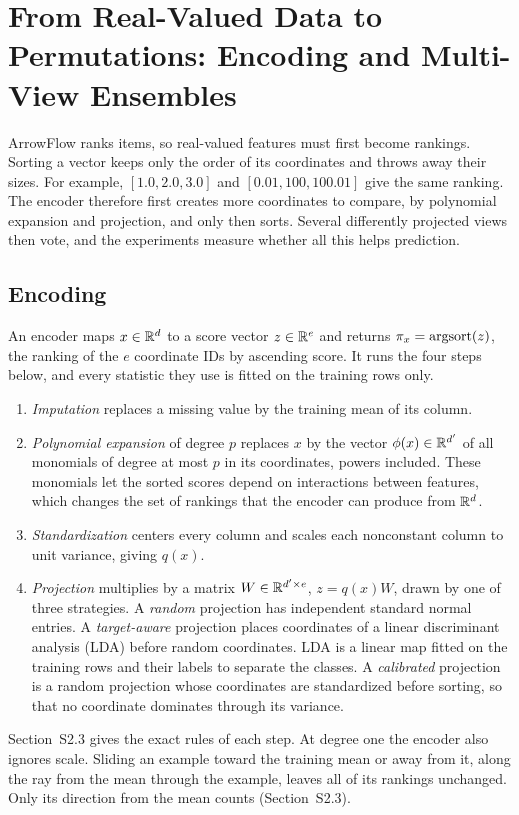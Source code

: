 \section{From Real-Valued Data to Permutations: Encoding and Multi-View Ensembles}\label{sec:encoding}

ArrowFlow ranks items, so real-valued features must first become rankings. Sorting a vector keeps only the order of its coordinates and throws away their sizes. For example, $[1.0,2.0,3.0]$ and $[0.01,100,100.01]$ give the same ranking. The encoder therefore first creates more coordinates to compare, by polynomial expansion and projection, and only then sorts. Several differently projected views then vote, and the experiments measure whether all this helps prediction.

\subsection{Encoding}\label{sec:encoder}

An encoder maps $x\in\mathbb{R}^d$ to a score vector $z\in\mathbb{R}^e$ and returns $\pi_x=\mathrm{argsort}(z)$, the ranking of the $e$ coordinate IDs by ascending score. It runs the four steps below, and every statistic they use is fitted on the training rows only.
\begin{enumerate}[leftmargin=2em,topsep=2pt,itemsep=1pt]
\item \emph{Imputation} replaces a missing value by the training mean of its column.
\item \emph{Polynomial expansion} of degree $p$ replaces $x$ by the vector $\phi(x)\in\mathbb{R}^{d'}$ of all monomials of degree at most $p$ in its coordinates, powers included. These monomials let the sorted scores depend on interactions between features, which changes the set of rankings that the encoder can produce from $\mathbb{R}^d$.
\item \emph{Standardization} centers every column and scales each nonconstant column to unit variance, giving $q(x)$.
\item \emph{Projection} multiplies by a matrix $W\in\mathbb{R}^{d'\times e}$, $z=q(x)W$, drawn by one of three strategies. A \emph{random} projection has independent standard normal entries. A \emph{target-aware} projection places coordinates of a linear discriminant analysis (LDA) before random coordinates. LDA is a linear map fitted on the training rows and their labels to separate the classes. A \emph{calibrated} projection is a random projection whose coordinates are standardized before sorting, so that no coordinate dominates through its variance.
\end{enumerate}
Section~S2.3 gives the exact rules of each step. At degree one the encoder also ignores scale. Sliding an example toward the training mean or away from it, along the ray from the mean through the example, leaves all of its rankings unchanged. Only its direction from the mean counts (Section~S2.3).


